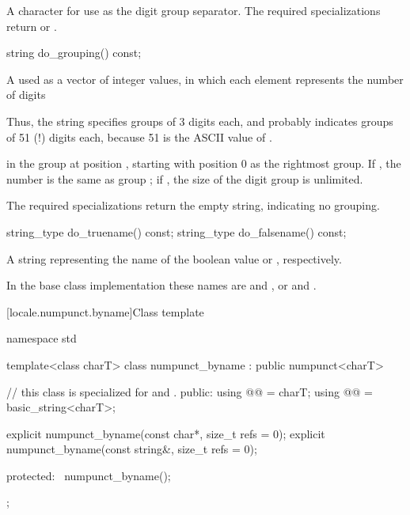 \begin{itemdescr}
\pnum
\returns
A character for use as the digit group separator.
The required specializations return  or .
\end{itemdescr}

%
\begin{itemdecl}
string do_grouping() const;
\end{itemdecl}

\begin{itemdescr}
\pnum
\returns
A   used as a vector of integer values,
in which each element  represents the number of digits
\begin{footnote}
Thus,
the string  specifies groups of 3 digits each, and
 probably indicates groups of 51 (!) digits each,
because 51 is the ASCII value of .
\end{footnote}
in the group at position ,
starting with position 0 as the rightmost group.
If ,
the number is the same as group ;
if ,
the size of the digit group is unlimited.

\pnum
The required specializations return the empty string, indicating no grouping.
\end{itemdescr}

%
%
\begin{itemdecl}
string_type do_truename()  const;
string_type do_falsename() const;
\end{itemdecl}

\begin{itemdescr}
\pnum
\returns
A string representing the name of
the boolean value  or , respectively.

\pnum
In the base class implementation
these names are  and ,
or  and .
\end{itemdescr}

[locale.numpunct.byname]{Class template }

%
\begin{codeblock}
namespace std {
  template<class charT>
  class numpunct_byname : public numpunct<charT> {
  // this class is specialized for  and .
  public:
    using @@   = charT;
    using @@ = basic_string<charT>;

    explicit numpunct_byname(const char*, size_t refs = 0);
    explicit numpunct_byname(const string&, size_t refs = 0);

  protected:
    ~numpunct_byname();
  };
}
\end{codeblock}

